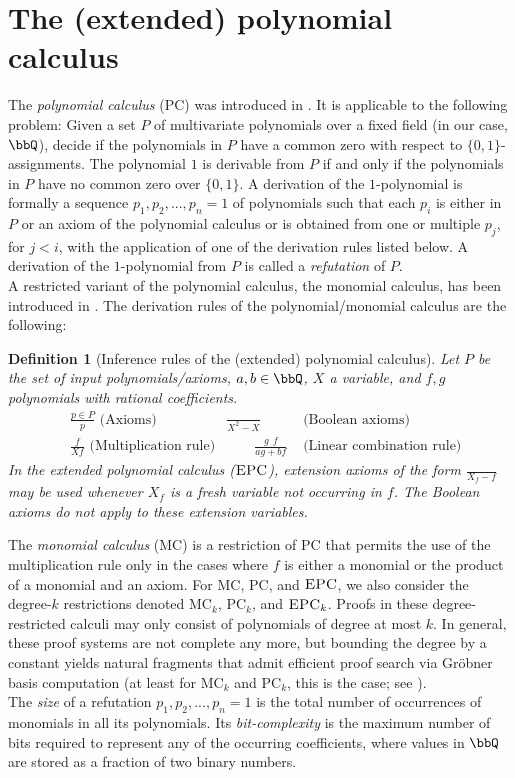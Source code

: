 \documentclass[10pt,a4paper]{article}
\newtheorem{definition}[theorem]{Definition}
\newcommand{\EPC}{\mbox{\sc EPC}}
\newcommand{\PC}{\textrm {PC}}
\newcommand{\MC}{\textrm{MC}}
\begin{document}
	
	\section{The (extended) polynomial calculus}
	
	\label{sec:proofSystems}
	The \emph{polynomial calculus} ($\PC$) was introduced in \cite{groebner}. It is applicable to the following problem: Given a set $P$ of multivariate polynomials over a fixed field (in our case, $\bbQ$), decide if the polynomials in $P$ have a common zero with respect to $\{0,1\}$-assignments. The polynomial $1$ is derivable from $P$ if and only if the polynomials in $P$ have no common zero over $\{0,1\}$. A derivation of the $1$-polynomial is formally a sequence $p_1,p_2,...,p_n = 1$ of polynomials such that each $p_i$ is either in $P$ or an axiom of the polynomial calculus or is obtained from one or multiple $p_j$, for $j < i$, with the application of one of the derivation rules listed below. A derivation of the $1$-polynomial from $P$ is called a \emph{refutation} of $P$.\\
	A restricted variant of the polynomial calculus, the monomial calculus, has been introduced in \cite{berkholz}.
	The derivation rules of the polynomial/monomial calculus are the following:
	\begin{definition}[Inference rules of the (extended) polynomial calculus]
		Let $P$ be the set of input polynomials/axioms, $a,b \in \bbQ$, $X$ a variable, and $f,g$ polynomials with rational coefficients.
		\begin{align*}
			&\frac{p \in P}{p} \text{ (Axioms)}  \qquad &\frac{}{X^2 - X} &\text{ (Boolean axioms)} \\ &\frac{f}{Xf} 
			\text{ (Multiplication rule)} &\qquad
			\frac{g \ \ f}{ag+bf} &\text{ (Linear 
				combination rule)} 
		\end{align*}
		In the \emph{extended polynomial calculus} ($\EPC$), \emph{extension axioms} of the form $\frac{}{X_f - f}$ may be used whenever $X_f$ is a fresh variable not occurring in $f$. The Boolean axioms do not apply to these extension variables.
	\end{definition}
	The \emph{monomial calculus} ($\MC$) is a restriction of $\PC$ that permits the
	use of the multiplication rule only in the cases where $f$ is either a 
	monomial or the product of a monomial and an axiom.	For $\MC$, $\PC$, and $\EPC$, we also consider the degree-$k$ restrictions denoted $\MC_k$, $\PC_k$, and $\EPC_k$. Proofs in these degree-restricted calculi may only consist of polynomials of degree at most $k$. In general, these proof systems are not complete any more, but bounding the degree by a constant yields natural fragments that admit efficient proof search via Gröbner basis computation (at least for $\MC_k$ and $\PC_k$, this is the case; see \cite{groebner}).\\
	The \emph{size} of a refutation $p_1,p_2,...,p_n = 1$ is the total number of occurrences of monomials in all its polynomials. Its \emph{bit-complexity} is the maximum number of bits required to represent any of the occurring coefficients, where values in $\bbQ$ are stored as a fraction of two binary numbers.\\ 
\end{document}
